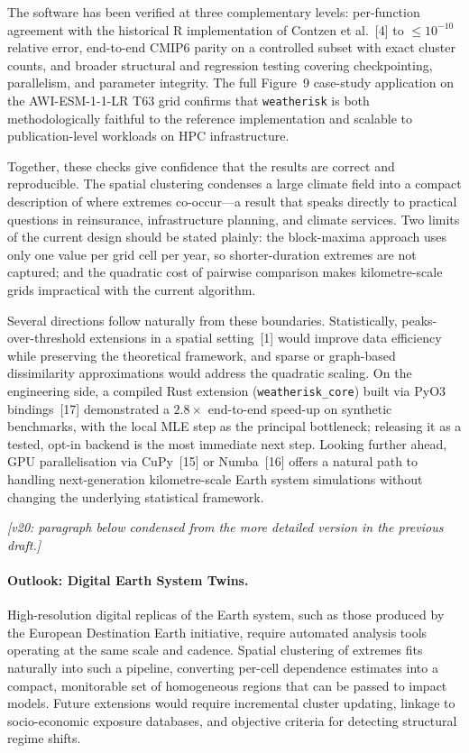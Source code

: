 \documentclass[preprint,12pt,a4paper]{elsarticle}
\newcommand{\revb}[1]{{#1}}
\newcommand{\revg}[1]{{#1}}
\newcommand{\revo}[1]{{#1}}
\newcommand{\revn}[1]{{\color{RevisionViolet}#1}}
\begin{document}
\revg{The software has been verified at three complementary levels:
per-function agreement with the historical R implementation of
Contzen et al.~[4] to $\leq 10^{-10}$ relative error,
end-to-end CMIP6 parity on a controlled subset \revb{with exact
cluster counts}, and broader structural and regression testing
covering checkpointing, parallelism, and parameter integrity.
The full Figure~9 \revb{case-study application} on the
AWI-ESM-1-1-LR T63 grid confirms that \texttt{weatherisk} is both
methodologically faithful to the reference implementation and
scalable to publication-level workloads on HPC infrastructure.}

\revg{Together, these checks give confidence that the results are correct and reproducible. The spatial clustering condenses a large
climate field into a compact description of where extremes co-occur---a
result that speaks directly to practical questions in reinsurance,
infrastructure planning, and climate services. Two limits of the current
design should be stated plainly: the block-maxima approach uses only
one value per grid cell per year, so shorter-duration extremes are
not captured; and the quadratic cost of pairwise comparison makes
kilometre-scale grids impractical with the current algorithm.}

\revo{Several directions follow naturally from these boundaries.
Statistically, peaks-over-threshold extensions in a spatial
setting~[1] would improve data efficiency while preserving the
theoretical framework, and sparse or graph-based dissimilarity
approximations would address the quadratic scaling. On the
engineering side, a compiled Rust extension
(\texttt{weatherisk\_core}) built via PyO3 bindings~[17] demonstrated
a $2.8\times$ end-to-end speed-up on synthetic benchmarks, with the
local MLE step as the principal bottleneck; releasing it as a tested,
opt-in backend is the most immediate next step. Looking further
ahead, GPU parallelisation via CuPy~[15] or Numba~[16] offers a
natural path to handling next-generation kilometre-scale Earth system
simulations without changing the underlying statistical framework.}

\revn{\textit{[v20: paragraph below condensed from the more detailed version in the previous draft.]}}
\revg{\paragraph{Outlook: Digital Earth System Twins.}
High-resolution digital replicas of the Earth system, such as those
produced by the European Destination Earth initiative, require automated
analysis tools operating at the same scale and cadence.
Spatial clustering of extremes fits naturally into such a pipeline,
converting per-cell dependence estimates into a compact, monitorable
set of homogeneous regions that can be passed to impact models.
Future extensions would require incremental cluster updating, linkage
to socio-economic exposure databases, and objective criteria for
detecting structural regime shifts.}
\end{document}
